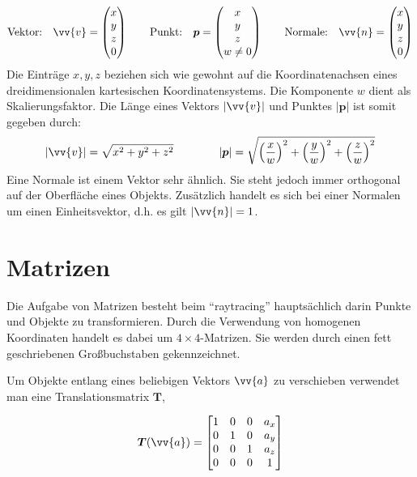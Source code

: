 \begin{equation*}
\text{Vektor:} \quad \vv{v} = \begin{pmatrix}
 x \\ y \\ z \\ 0
\end{pmatrix}
\qquad
\text{Punkt:} \quad \boldsymbol{p} = \begin{pmatrix}
x \\ y \\ z \\ w \ne 0
\end{pmatrix}
\qquad
\text{Normale:} \quad \vv{n} = \begin{pmatrix}
x \\ y \\ z \\ 0
\end{pmatrix}
\end{equation*}
Die Einträge \(x, y, z\) beziehen sich wie gewohnt auf die Koordinatenachsen eines dreidimensionalen kartesischen Koordinatensystems. Die Komponente \(w\) dient als Skalierungsfaktor. Die Länge eines Vektors \( |\vv{v}| \) und Punktes \( |\boldsymbol{p}| \) ist somit gegeben durch:
\begin{equation*}
|\vv{v}| = \sqrt{x^2+y^2+z^2} \quad \quad \quad \quad
|\boldsymbol{p}| = \sqrt{\left(\frac{x}{w} \right)^2
                         + \left(\frac{y}{w}\right)^2 
                         + \left(\frac{z}{w}\right)^2
                        }
\end{equation*}
Eine Normale ist einem Vektor sehr ähnlich. Sie steht jedoch immer orthogonal auf der Oberfläche eines Objekts. Zusätzlich handelt es sich bei einer Normalen um einen Einheitsvektor, d.h. es gilt \( |\vv{n}| = 1 \).


\section{Matrizen}

Die Aufgabe von Matrizen besteht beim "`raytracing"' hauptsächlich darin Punkte und Objekte zu transformieren. Durch die Verwendung von homogenen Koordinaten handelt es dabei um \( 4 \times 4  \)-Matrizen. Sie werden durch einen fett geschriebenen Großbuchstaben gekennzeichnet.

Um Objekte entlang eines beliebigen Vektors \( \vv{a} \) zu verschieben verwendet man eine Translationsmatrix \( \boldsymbol{T} \),

\begin{equation}
    \boldsymbol{T}( \vv{a} ) = 
    \begin{bmatrix}
        1 & 0 & 0 & a_x \\
        0 & 1 & 0 & a_y \\
        0 & 0 & 1 & a_z \\
        0 & 0 & 0 & 1
    \end{bmatrix}
\end{equation}

